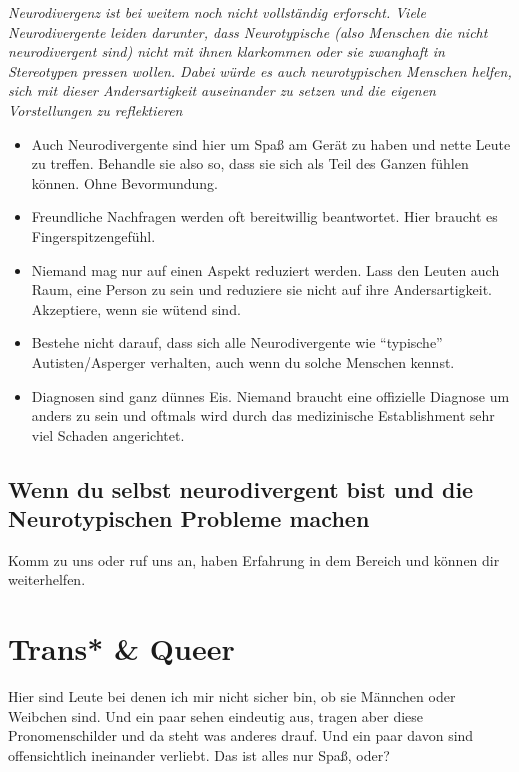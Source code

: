 \documentclass[10pt,foldmark]{leaflet}
\newcommand\dos{\item[$+$]}
\newcommand\donts{\item[$-$]}
\begin{document}
\emph{Neurodivergenz ist bei weitem noch nicht vollständig
  erforscht. Viele Neurodivergente leiden darunter, dass Neurotypische
  (also Menschen die nicht neurodivergent sind) nicht mit ihnen
  klarkommen oder sie zwanghaft in Stereotypen pressen wollen. Dabei
  würde es auch neurotypischen Menschen helfen, sich mit dieser
  Andersartigkeit auseinander zu setzen und die eigenen Vorstellungen
  zu reflektieren}

\label{sec-3-1}
\begin{itemize}
\dos Auch Neurodivergente sind hier um Spaß am Gerät zu haben und
  nette Leute zu treffen. Behandle sie also so, dass sie sich als Teil
  des Ganzen fühlen können. Ohne Bevormundung.
\dos Freundliche Nachfragen werden oft bereitwillig beantwortet. Hier
  braucht es Fingerspitzengefühl.
\donts Niemand mag nur auf einen Aspekt reduziert werden. Lass den
  Leuten auch Raum, eine Person zu sein und reduziere sie nicht auf
  ihre Andersartigkeit. Akzeptiere, wenn sie wütend sind.
\donts Bestehe nicht darauf, dass sich alle Neurodivergente wie
  ``typische'' Autisten/Asperger verhalten, auch wenn du solche
  Menschen kennst.
\donts Diagnosen sind ganz dünnes Eis. Niemand braucht eine offizielle
  Diagnose um anders zu sein und oftmals wird durch das medizinische
  Establishment sehr viel Schaden angerichtet.
\end{itemize}

\subsection{Wenn du selbst neurodivergent bist und die Neurotypischen Probleme machen}
Komm zu uns oder ruf uns an, haben Erfahrung in dem
Bereich und können dir weiterhelfen.

\section{Trans* \& Queer}
\label{sec-5}
Hier sind Leute bei denen ich mir nicht sicher bin, ob sie Männchen
oder Weibchen sind. Und ein paar sehen eindeutig aus, tragen aber
diese Pronomenschilder und da steht was anderes drauf. Und ein paar
davon sind offensichtlich ineinander verliebt. Das ist alles nur Spaß,
oder?
\end{document}
